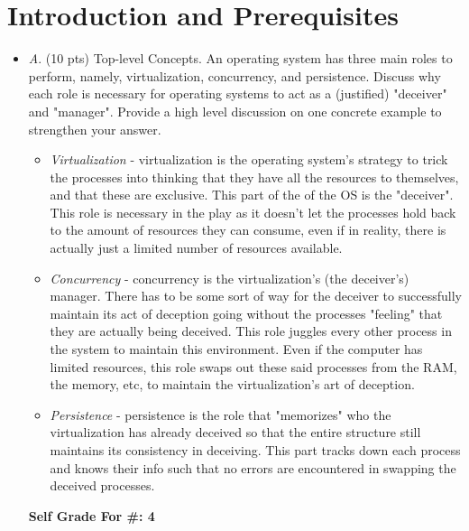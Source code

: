 \documentclass[conference]{IEEEtran}
\begin{document}
\section{Introduction and Prerequisites}
\begin{itemize}
	\item \textit{A}. (10 pts) Top-level Concepts. An operating system has three main roles to perform, namely, virtualization, concurrency, and persistence. Discuss why each role is necessary for operating systems to act as a (justified) "deceiver" and "manager". Provide a high level discussion on one concrete example to strengthen your answer. 
	\begin{itemize} 
		\item \textit{Virtualization} - virtualization is the operating system's strategy to trick the processes into thinking that they have all the resources to themselves, and that these are exclusive. This part of the of the OS is the "deceiver". This role is necessary in the play as it doesn't let the processes hold back to the amount of resources they can consume, even if in reality, there is actually just a limited number of resources available. 
		\item \textit{Concurrency} - concurrency is the virtualization's (the deceiver's) manager. There has to be some sort of way for the deceiver to successfully maintain its act of deception going without the processes "feeling" that they are actually being deceived.  This role juggles every other process in the system to maintain this environment. Even if the computer has limited resources, this role swaps out these said processes from the RAM, the memory, etc, to maintain the virtualization's art of deception.
		\item \textit{Persistence} - persistence is the role that "memorizes" who the virtualization has already deceived so that the entire structure still maintains its consistency in deceiving. This part tracks down each process and knows their info such that no errors are encountered in swapping the deceived processes. 
	\end{itemize} 
\begin{center}
\textbf{Self Grade For \#: 4}
\end{center}
\end{itemize}
\end{document}
